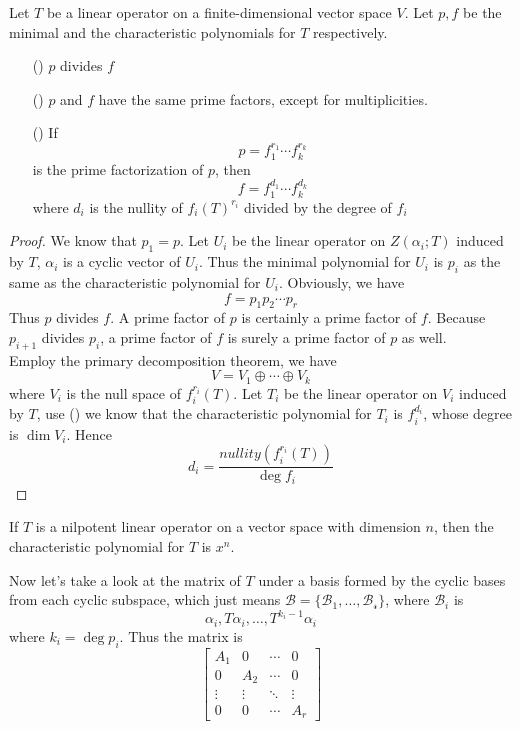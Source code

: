 \documentclass{article}
\begin{document}
\begin{thm}
	Let $T$ be a linear operator on a finite-dimensional vector space $V$. Let $p,f$ be the minimal and the characteristic polynomials for $T$ respectively.
	\begin{enumerate}
		\item [(\romannumeral1)]$p$ divides $f$
		\item [(\romannumeral2)]$p$ and $f$ have the same prime factors, except for multiplicities.
		\item [(\romannumeral3)]If \[p=f_1^{r_1}\cdots f_k^{r_k}\]
		is the prime factorization of $p$, then
		\[f=f_1^{d_1}\cdots f_k^{d_k}\]
		where $d_i$ is the nullity of $f_i(T)^{r_i}$ divided by the degree of $f_i$
	\end{enumerate}
\end{thm}
\begin{proof}
	We know that $p_1=p$. Let $U_i$ be the linear operator on $Z(\alpha_i;T)$ induced by $T$, $\alpha_i$ is a cyclic vector of $U_i$. Thus the minimal polynomial for $U_i$ is $p_i$ as the same as the characteristic polynomial for $U_i$. Obviously, we have
	\[f=p_1p_2\cdots p_r\]
	Thus $p$ divides $f$. A prime factor of $p$ is certainly a prime factor of $f$. Because $p_{i+1}$ divides $p_i$, a prime factor of $f$ is surely a prime factor of $p$ as well.\\
	Employ the primary decomposition theorem, we have
	\[V=V_1\oplus\cdots\oplus V_k\]
	where $V_i$ is the null space of $f_i^{r_i}(T)$. Let $T_i$ be the linear operator on $V_i$ induced by $T$, use () we know that the characteristic polynomial for $T_i$ is $f_i^{d_i}$, whose degree is $\dim V_i$. Hence
	\[d_i=\frac{nullity(f_i^{r_i}(T))}{\deg f_i}\]
\end{proof}
\begin{coro}
	If $T$ is a nilpotent linear operator on a vector space with dimension $n$, then the characteristic polynomial for $T$ is $x^n$. 
\end{coro}
Now let's take a look at the matrix of $T$ under a basis formed by the cyclic bases from each cyclic subspace, which just means $\mathcal{B}=\{\mathcal{B}_1,\dots,\mathcal{B_r}\}$, where $\mathcal{B}_i$ is
\[\alpha_i,T\alpha_i,\dots,T^{k_i-1}\alpha_i\]
where $k_i=\deg p_i$. Thus the matrix is
\[\begin{bmatrix}
	A_1&0&\cdots&0\\
	0&A_2&\cdots&0\\
	\vdots&\vdots&\ddots&\vdots\\
	0&0&\cdots&A_r
\end{bmatrix}\]
\end{document}
